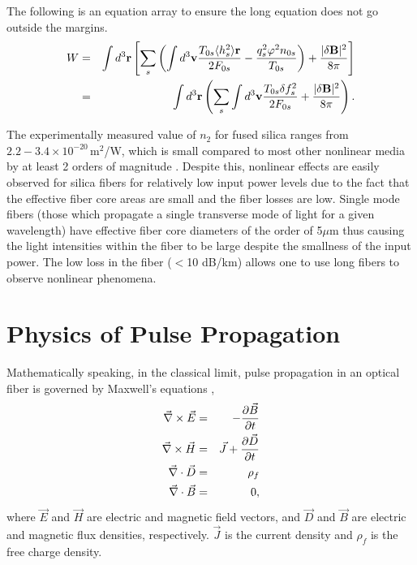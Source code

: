 The following is an equation array to ensure the long equation does not go outside the margins.
\begin{eqnarray}
W & = & \int d^3{\bf r} \left[ \sum_s \left( \int d^3{\bf v} {T_{0s} \langle h^2_s \rangle {\bf r} \over 2F_{0s}} - {q^2_s\varphi^2 n_{0s} \over T_{0s}} \right) + {|\delta {\bf B}|^2 \over 8 \pi} \right] \nonumber \\
& = & \int d^3{\bf r} \left( \sum_s \int d^3{\bf v} {T_{0s}\delta f^2_s \over 2F_{0s}} + {|\delta {\bf B}|^2 \over 8\pi} \right) .
\end{eqnarray}

The experimentally measured value of $n_{2}$ for fused silica ranges from $2.2 - 3.4 \times
10^{-20}$\,m$^2$/W, which is small compared to most other nonlinear media by
at least 2 orders of magnitude \cite{Agrawal1}. Despite this, nonlinear effects are
easily observed for silica fibers for relatively low input power levels due
to the fact that the effective fiber core areas are small and the fiber losses are low.
Single mode fibers (those which propagate a single transverse mode of light for a given
wavelength) have effective fiber core diameters of the order of 5$\mu$m thus causing
the light intensities within the fiber to be large despite the smallness of the input
power. The low loss in the fiber ($<$10 dB/km) allows one to use long fibers to observe
nonlinear phenomena.

\section{Physics of Pulse Propagation}

Mathematically speaking, in the classical limit, pulse propagation in an
optical fiber is governed by Maxwell's equations \cite{Agrawal2,Diament},
\begin{eqnarray}
\vec{\nabla}\times\vec{E} & = &- {\partial \vec{B} \over \partial t} \nonumber\\
\vec{\nabla}\times\vec{H} & = & \vec{J}+ {\partial \vec{D} \over \partial t}
\nonumber\\
\vec{\nabla}\cdot\vec{D} & = & \rho_{f} \nonumber\\
\vec{\nabla}\cdot\vec{B} & = & 0 ,
\end{eqnarray}
where $\vec{E}$ and $\vec{H}$ are electric and magnetic field
vectors, and
$\vec{D}$ and $\vec{B}$ are electric and magnetic flux densities,
respectively. $\vec{J}$ is the current density and $\rho_{f}$ is the free
charge density.


